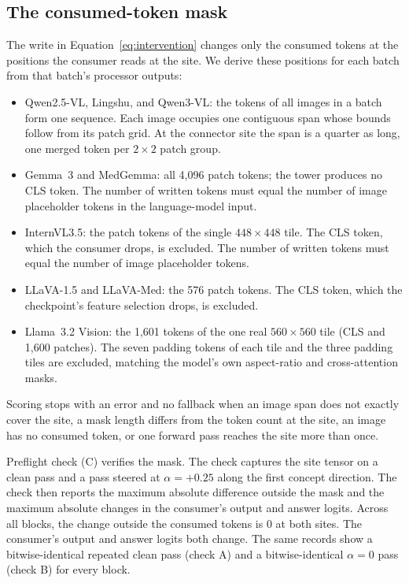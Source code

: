 \documentclass[11pt]{article}
\begin{document}
\subsection{The consumed-token mask}
\label{app:repro-mask}

The write in Equation~\ref{eq:intervention} changes only the consumed tokens at the positions the consumer reads at the site. We derive these positions for each batch from that batch's processor outputs:

\begin{itemize}[leftmargin=*,itemsep=1pt,topsep=2pt]
\item Qwen2.5-VL, Lingshu, and Qwen3-VL: the tokens of all images in a batch form one sequence. Each image occupies one contiguous span whose bounds follow from its patch grid. At the connector site the span is a quarter as long, one merged token per $2\times2$ patch group.
\item Gemma~3 and MedGemma: all 4{,}096 patch tokens; the tower produces no CLS token. The number of written tokens must equal the number of image placeholder tokens in the language-model input.
\item InternVL3.5: the patch tokens of the single $448\times448$ tile. The CLS token, which the consumer drops, is excluded. The number of written tokens must equal the number of image placeholder tokens.
\item LLaVA-1.5 and LLaVA-Med: the 576 patch tokens. The CLS token, which the checkpoint's feature selection drops, is excluded.
\item Llama~3.2 Vision: the 1{,}601 tokens of the one real $560\times560$ tile (CLS and 1{,}600 patches). The seven padding tokens of each tile and the three padding tiles are excluded, matching the model's own aspect-ratio and cross-attention masks.
\end{itemize}

Scoring stops with an error and no fallback when an image span does not exactly cover the site, a mask length differs from the token count at the site, an image has no consumed token, or one forward pass reaches the site more than once.

Preflight check (C) verifies the mask. The check captures the site tensor on a clean pass and a pass steered at $\alpha=+0.25$ along the first concept direction. The check then reports the maximum absolute difference outside the mask and the maximum absolute changes in the consumer's output and answer logits. Across all \cfBlocks{} blocks, the change outside the consumed tokens is $0$ at both sites. The consumer's output and answer logits both change. The same records show a bitwise-identical repeated clean pass (check A) and a bitwise-identical $\alpha=0$ pass (check B) for every block.
\end{document}

